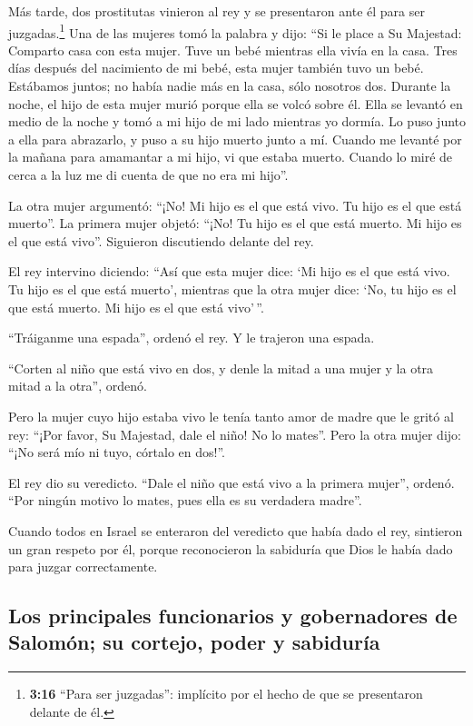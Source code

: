  Más tarde, dos prostitutas vinieron al rey y se
presentaron ante él para ser juzgadas.\footnote{\textbf{3:16} ``Para ser
  juzgadas'': implícito por el hecho de que se presentaron delante de
  él.}  Una de las mujeres tomó la palabra y dijo: ``Si
le place a Su Majestad: Comparto casa con esta mujer. Tuve un bebé
mientras ella vivía en la casa.  Tres días después del
nacimiento de mi bebé, esta mujer también tuvo un bebé. Estábamos
juntos; no había nadie más en la casa, sólo nosotros dos.
 Durante la noche, el hijo de esta mujer murió porque
ella se volcó sobre él.  Ella se levantó en medio de la
noche y tomó a mi hijo de mi lado mientras yo dormía. Lo puso junto a
ella para abrazarlo, y puso a su hijo muerto junto a mí. 
Cuando me levanté por la mañana para amamantar a mi hijo, vi que estaba
muerto. Cuando lo miré de cerca a la luz me di cuenta de que no era mi
hijo''.

 La otra mujer argumentó: ``¡No! Mi hijo es el que está
vivo. Tu hijo es el que está muerto''. La primera mujer objetó: ``¡No!
Tu hijo es el que está muerto. Mi hijo es el que está vivo''. Siguieron
discutiendo delante del rey.

 El rey intervino diciendo: ``Así que esta mujer dice:
`Mi hijo es el que está vivo. Tu hijo es el que está muerto', mientras
que la otra mujer dice: `No, tu hijo es el que está muerto. Mi hijo es
el que está vivo'\,''.

 ``Tráiganme una espada'', ordenó el rey. Y le trajeron
una espada.

 ``Corten al niño que está vivo en dos, y denle la mitad
a una mujer y la otra mitad a la otra'', ordenó.

 Pero la mujer cuyo hijo estaba vivo le tenía tanto amor
de madre que le gritó al rey: ``¡Por favor, Su Majestad, dale el niño!
No lo mates''. Pero la otra mujer dijo: ``¡No será mío ni tuyo, córtalo
en dos!''.

 El rey dio su veredicto. ``Dale el niño que está vivo a
la primera mujer'', ordenó. ``Por ningún motivo lo mates, pues ella es
su verdadera madre''.

 Cuando todos en Israel se enteraron del veredicto que
había dado el rey, sintieron un gran respeto por él, porque reconocieron
la sabiduría que Dios le había dado para juzgar correctamente.

\hypertarget{los-principales-funcionarios-y-gobernadores-de-salomuxf3n-su-cortejo-poder-y-sabiduruxeda}{%
\subsection{Los principales funcionarios y gobernadores de Salomón; su
cortejo, poder y
sabiduría}\label{los-principales-funcionarios-y-gobernadores-de-salomuxf3n-su-cortejo-poder-y-sabiduruxeda}}

